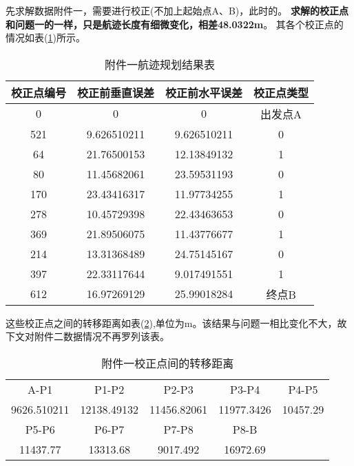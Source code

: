 先求解数据附件一，需要进行校正(不加上起始点A、B)，此时的。
\textbf{求解的校正点和问题一的一样，只是航迹长度有细微变化，相差48.0322m}。
其各个校正点的情况如表(\ref{tab:res-qu2-1})所示。
\begin{table}[!htbp]
	\caption{附件一航迹规划结果表} 
	\label{tab:res-qu2-1}
	\centering
	\begin{tabular}{cccc} 
		\toprule[1.5pt] 
        校正点编号 & 校正前垂直误差 & 校正前水平误差 & 校正点类型 \\
		\midrule[1pt] 
        0     & 0 & 0 & 出发点A \\
        \multicolumn{1}{c}{521} & 9.626510211 & 9.626510211 & \multicolumn{1}{c}{0} \\
        \multicolumn{1}{c}{64} & 21.76500153 & 12.13849132 & \multicolumn{1}{c}{1} \\
        \multicolumn{1}{c}{80} & 11.45682061 & 23.59531193 & \multicolumn{1}{c}{0} \\
        \multicolumn{1}{c}{170} & 23.43416317 & 11.97734255 & \multicolumn{1}{c}{1} \\
        \multicolumn{1}{c}{278} & 10.45729398 & 22.43463653 & \multicolumn{1}{c}{0} \\
        \multicolumn{1}{c}{369} & 21.89506075 & 11.43776677 & \multicolumn{1}{c}{1} \\
        \multicolumn{1}{c}{214} & 13.31368489 & 24.75145167 & \multicolumn{1}{c}{0} \\
        \multicolumn{1}{c}{397} & 22.33117644 & 9.017491551 & \multicolumn{1}{c}{1} \\
        612   & 16.97269129 & 25.99018284 & 终点B \\
		\bottomrule[1.5pt] 
\end{tabular}\end{table}

这些校正点之间的转移距离如表(\ref{tab:qu2-1-dis}),单位为m。该结果与问题一相比变化不大，故下文对附件二数据情况不再罗列该表。
\begin{table}[!htbp]
	\caption{附件一校正点间的转移距离} 
	\label{tab:qu2-1-dis}
	\centering
	\begin{tabular}{ccccc} 
		\hline
        A-P1  & P1-P2 & P2-P3 & P3-P4 & P4-P5 \\
        9626.510211 & 12138.49132 & 11456.82061 & 11977.3426 & 10457.29 \\ \hline \hline 
    P5-P6 & P6-P7 & P7-P8 & P8-B  &  \\
    11437.77 & 13313.68 & 9017.492 & 16972.69 &  \\ \hline 
\end{tabular}\end{table}

